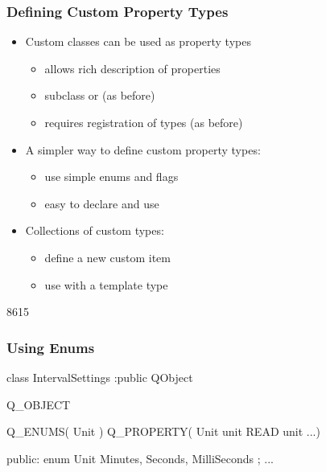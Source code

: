 \begin{slide}[fragile]\frametitle{Defining Custom Property Types}
\begin{itemize}
\item Custom classes can be used as property types
  \begin{itemize}
  \item allows rich description of properties
  \item subclass  or
 (as before)
  \item requires registration of types (as before)
  \end{itemize}

\vspace*{0.5em}
\item A simpler way to define custom property types:
  \begin{itemize}
  \item use simple enums and flags
  \item easy to declare and use
  \end{itemize}

\vspace*{0.5em}
\item Collections of custom types:
  \begin{itemize}
  \item define a new custom item
  \item use with a  template type
  \end{itemize}
\end{itemize}
\end{slide}

\begin{slide}[fragile]{8615}\frametitle{Using Enums}
\begin{cpp}
class IntervalSettings :public QObject
{
    Q_OBJECT

    Q_ENUMS( Unit )
    Q_PROPERTY( Unit unit READ unit ...)

public:
    enum Unit { Minutes, Seconds, MilliSeconds };
    ...
}\end{cpp}
\vspace{5mm}
\begin{qml}
\\
\\
\\
\\
\qtt{~~~~\}}\\
\qtt{\}}\\
\end{qml}
\end{slide}

